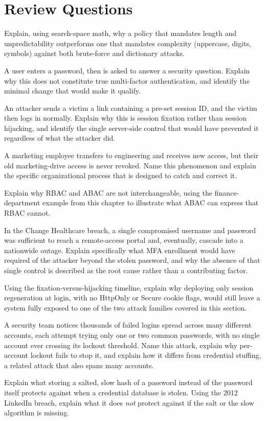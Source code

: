 \section*{Review Questions}
\begin{reviewquestions}
\item Explain, using search-space math, why a policy that mandates length and unpredictability
outperforms one that mandates complexity (uppercase, digits, symbols) against both brute-force and
dictionary attacks.
\item A user enters a password, then is asked to answer a security question. Explain why this does
not constitute true multi-factor authentication, and identify the minimal change that would make it
qualify.
\item An attacker sends a victim a link containing a pre-set session ID, and the victim then logs in
normally. Explain why this is session fixation rather than session hijacking, and identify the
single server-side control that would have prevented it regardless of what the attacker did.
\item A marketing employee transfers to engineering and receives new access, but their old
marketing-drive access is never revoked. Name this phenomenon and explain the specific organizational
process that is designed to catch and correct it.
\item Explain why RBAC and ABAC are not interchangeable, using the finance-department example from
this chapter to illustrate what ABAC can express that RBAC cannot.
\item In the Change Healthcare breach, a single compromised username and password was sufficient
to reach a remote-access portal and, eventually, cascade into a nationwide outage. Explain
specifically what MFA enrollment would have required of the attacker beyond the stolen password,
and why the absence of that single control is described as the root cause rather than a
contributing factor.
\item Using the fixation-versus-hijacking timeline, explain why deploying only session
regeneration at login, with no HttpOnly or Secure cookie flags, would still leave a system fully
exposed to one of the two attack families covered in this section.
\item A security team notices thousands of failed logins spread across many different accounts,
each attempt trying only one or two common passwords, with no single account ever crossing its
lockout threshold. Name this attack, explain why per-account lockout fails to stop it, and explain
how it differs from credential stuffing, a related attack that also spans many accounts.
\item Explain what storing a salted, slow hash of a password instead of the password itself
protects against when a credential database is stolen. Using the 2012 LinkedIn breach, explain what
it does \emph{not} protect against if the salt or the slow algorithm is missing.
\end{reviewquestions}

